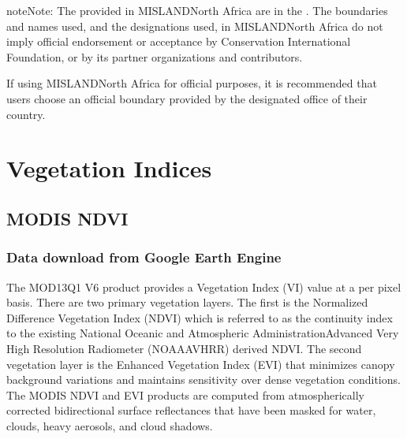 \documentclass[letterpaper,10pt,english]{sphinxmanual}
\begin{document}
\begin{sphinxadmonition}{note}{Note:}
\sphinxAtStartPar
The  provided in MISLAND\sphinxhyphen{}North Africa
are in the . The boundaries and names used, and the
designations used, in MISLAND\sphinxhyphen{}North Africa do not imply official endorsement or
acceptance by Conservation International Foundation, or by its partner
organizations and contributors.

\sphinxAtStartPar
If using MISLAND\sphinxhyphen{}North Africa for official purposes, it is recommended that users
choose an official boundary provided by the designated office of their
country.
\end{sphinxadmonition}

\sphinxstepscope


\chapter{Vegetation Indices}
\label{\detokenize{Preprocessing/NDVI:vegetation-indices}}\label{\detokenize{Preprocessing/NDVI::doc}}

\section{MODIS NDVI}
\label{\detokenize{Preprocessing/NDVI:modis-ndvi}}

\subsection{Data download from Google Earth Engine}
\label{\detokenize{Preprocessing/NDVI:data-download-from-google-earth-engine}}
\sphinxAtStartPar
The MOD13Q1 V6 product provides a Vegetation Index (VI) value at a per pixel basis. There are two primary vegetation layers. The first is the Normalized Difference Vegetation Index (NDVI) which is referred to as the continuity index to the existing National Oceanic and Atmospheric Administration\sphinxhyphen{}Advanced Very High Resolution Radiometer (NOAA\sphinxhyphen{}AVHRR) derived NDVI. The second vegetation layer is the Enhanced Vegetation Index (EVI) that minimizes canopy background variations and maintains sensitivity over dense vegetation conditions. The MODIS NDVI and EVI products are computed from atmospherically corrected bi\sphinxhyphen{}directional surface reflectances that have been masked for water, clouds, heavy aerosols, and cloud shadows.
\end{document}
